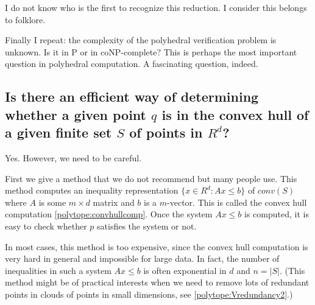 \documentclass[a4paper,12pt]{article}
\begin{document}
I do not know who is the first to recognize this reduction.
I consider this belongs to folklore.

Finally I repeat:  the complexity of the polyhedral verification
problem is unknown.  Is it in P or in coNP-complete?  
This is perhaps the most important question in polyhedral
computation.
A fascinating question, indeed.



\subsection{Is there an 
efficient way of determining whether a given point $q$
is in the convex hull of a given finite set $S$ of points in $R^d$?}
\label{polytope:Vredundancy}

Yes.  However, we need to be careful. 

First we give a method that we do not recommend but many people use.
This method computes an inequality
representation $\{x\in R^d: A x \le b \}$ of $conv(S)$ where
$A$ is some $m \times d$ matrix and $b$ is a $m$-vector.  
This is called the convex hull computation
\ref{polytope:convhullcomp}.  Once the system $A x \le b$ is
computed, it is easy to check whether $p$ satisfies the system
or not.

In most cases, this method is too expensive, since the convex
hull computation is very hard in general and impossible for
large data.  In fact,
 the number of inequalities in such a system $A x \le b$ 
is often exponential in $d$ and $n=|S|$.
(This method might be of practical interests when we need to
remove lots of redundant points in clouds of points in small dimensions, 
see \ref{polytope:Vredundancy2}.)
\end{document}
